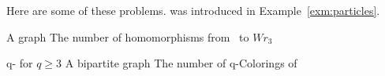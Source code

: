 Here are some of these problems.  was introduced in
Example~\ref{exm:particles}.

{A graph \mG}
{The number of homomorphisms from \mG\ to \(Wr_3\)}

\pdef
{ q- for \(q\ge 3\)}
{A bipartite graph \mG}
{The number of q-Colorings of \mG}
